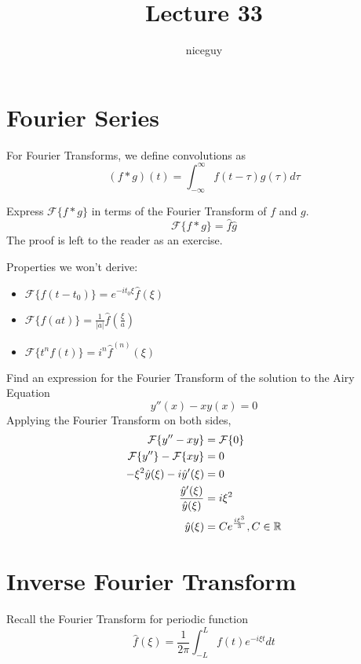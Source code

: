 \documentclass[12pt]{article}
\author{niceguy}
\title{Lecture 33}
\begin{document}
\maketitle

\section{Fourier Series}

For Fourier Transforms, we define convolutions as
$$(f*g)(t) = \int_{-\infty}^\infty f(t-\tau)g(\tau)d\tau$$

\begin{ex}
	Express $\mathcal{F}\{f*g\}$ in terms of the Fourier Transform of $f$ and $g$.
	$$\mathcal{F}\{f*g\} = \hat{f}\hat{g}$$
	The proof is left to the reader as an exercise.
\end{ex}

Properties we won't derive:
\begin{itemize}
	\item $\mathcal{F}\{f(t-t_0)\} = e^{-it_0\xi}\hat{f}(\xi)$
	\item $\mathcal{F}\{f(at)\} = \frac{1}{|a|}\hat{f}\left(\frac{\xi}{a}\right)$
	\item $\mathcal{F}\{t^nf(t)\} = i^n\hat{f}^{(n)}(\xi)$
\end{itemize}

\begin{ex}\label{airy}
	Find an expression for the Fourier Transform of the solution to the Airy Equation
	$$y''(x) - xy(x) = 0$$
	Applying the Fourier Transform on both sides,
	\begin{align*}
		\mathcal{F}\{y''-xy\} &= \mathcal{F}\{0\} \\
		\mathcal{F}\{y''\} - \mathcal{F}\{xy\} &= 0 \\
		-\xi^2\hat{y}(\xi) - i\hat{y}'(\xi) &= 0 \\
		\frac{\hat{y}'(\xi)}{\hat{y}(\xi)} &= i\xi^2 \\
		\hat{y}(\xi) &= Ce^{\frac{i\xi^3}{3}}, C \in \mathbb{R}
	\end{align*}
\end{ex}

\section{Inverse Fourier Transform}

Recall the Fourier Transform for periodic function
$$\hat{f}(\xi) = \frac{1}{2\pi}\int_{-L}^Lf(t)e^{-i\xi t}dt$$
\end{document}
